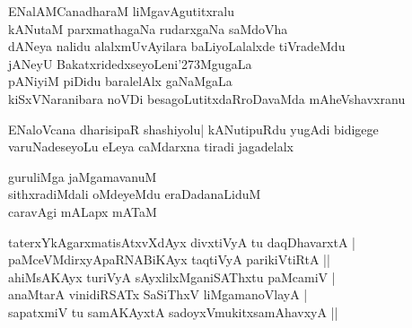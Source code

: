 \begin{entry}

\smallskip
\begin{shl}
ENalAMCanadharaM liMgavAgutitxralu\\
kANutaM parxmathagaNa rudarxgaNa saMdoVha\\
dANeya nalidu alalxmUvAyilara baLiyoLalalxde tiVradeMdu\\
jANeyU BakatxridedxseyoLeni\char'273MgugaLa\\
pANiyiM piDidu baralelAlx gaNaMgaLa\\
kiSxVNaranibara noVDi besagoLutitxdaRroDavaMda mAheVshavxranu
\end{shl}
\medskip
{}
\end{entry}

\begin{entry}

\smallskip
\begin{shl}
ENaloVcana dharisipaR shashiyolu| kANutipuRdu yugAdi bidigege
varuNadeseyoLu eLeya caMdarxna tiradi jagadelalx 
\end{shl}
\medskip
{}
\end{entry}

\begin{entry}
\smallskip
\begin{shl}
guruliMga jaMgamavanuM\\
sithxradiMdali oMdeyeMdu eraDadanaLiduM\\
caravAgi mALapx mATaM
\end{shl}
\medskip
{}
\end{entry}

\begin{entry}
\end{entry}

\begin{entry}
\smallskip
\begin{shl}
taterxYkAgarxmatisAtxvXdAyx divxtiVyA tu daqDhavarxtA |\\
paMceVMdirxyApaRNABiKAyx taqtiVyA parikiVtiRtA ||\\
ahiMsAKAyx turiVyA sAyxlilxMganiSAThxtu paMcamiV |\\
anaMtarA vinidiRSATx SaSiThxV liMgamanoVlayA |\\
sapatxmiV tu samAKAyxtA sadoyxVmukitxsamAhavxyA ||
\end{shl}
\medskip
{}
\end{entry}

